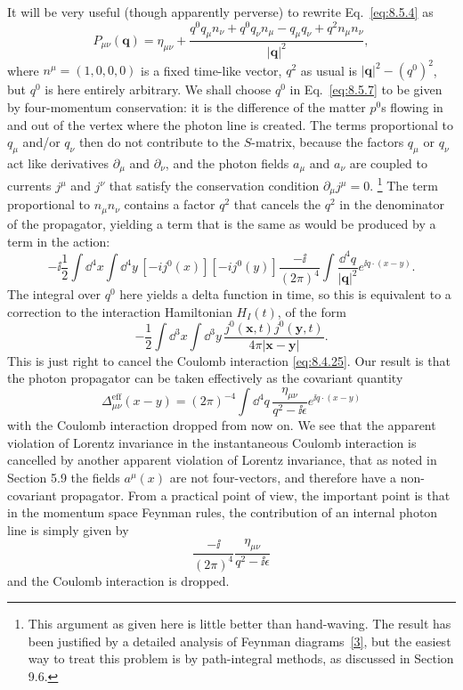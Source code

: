 It will be very useful (though apparently perverse) to rewrite Eq.~\eqref{eq:8.5.4} as
\begin{equation}
P_{\mu\nu}(\mathbf q)=\eta_{\mu\nu}
+\frac{q^0q_\mu n_\nu+q^0q_\nu n_\mu-q_\mu q_\nu+q^2n_\mu n_\nu}
       {\lvert\mathbf q\rvert^2},
\tag{8.5.7}\label{eq:8.5.7}
\end{equation}
where $n^\mu=(1,0,0,0)$ is a fixed time-like vector, $q^2$ as usual is
$\lvert\mathbf q\rvert^2-(q^0)^2$, but $q^0$ is here entirely
arbitrary. We shall choose $q^0$ in Eq.~\eqref{eq:8.5.7} to be given by
four-momentum conservation: it is the difference of the matter $p^0$s flowing
in and out of the vertex where the photon line is created. The terms
proportional to $q_\mu$ and/or $q_\nu$ then do not contribute to the $S$-matrix,
because the factors $q_\mu$ or $q_\nu$ act like derivatives $\partial_\mu$ and
$\partial_\nu$, and the photon fields $a_\mu$ and $a_\nu$ are coupled to
currents $j^\mu$ and $j^\nu$ that satisfy the conservation condition
$\partial_\mu j^\mu=0$.
\footnote{This argument as given here is little better than hand-waving. The
result has been justified by a detailed analysis of Feynman diagrams~\hyperref[ref:8.3]{[3]}, but
the easiest way to treat this problem is by path-integral methods, as discussed
in Section 9.6.}
The term proportional to $n_\mu n_\nu$ contains a factor $q^2$ that cancels the
$q^2$ in the denominator of the propagator, yielding a term that is the same
as would be produced by a term in the action:
\[
-\ii\frac12\int \dd^4x\int \dd^4y\,
[-ij^0(x)][-ij^0(y)]\frac{-\ii}{(2\pi)^4}
\int\frac{\dd^4q}{\lvert\mathbf q\rvert^2}e^{\ii q\cdot(x-y)}.
\]
The integral over $q^0$ here yields a delta function in time, so this is
equivalent to a correction to the interaction Hamiltonian $H_I(t)$, of the
form
\[
-\frac12\int \dd^3x\int \dd^3y\,
\frac{j^0(\mathbf x,t)j^0(\mathbf y,t)}
     {4\pi\lvert\mathbf x-\mathbf y\rvert}.
\]
This is just right to cancel the Coulomb interaction \eqref{eq:8.4.25}. Our result is
that the photon propagator can be taken effectively as the covariant quantity
\begin{equation}
\Delta^{\mathrm{eff}}_{\mu\nu}(x-y)
=(2\pi)^{-4}\int \dd^4q\,
\frac{\eta_{\mu\nu}}{q^2-\ii\epsilon}e^{\ii q\cdot(x-y)}
\tag{8.5.8}\label{eq:8.5.8}
\end{equation}
with the Coulomb interaction dropped from now on. We see that the apparent
violation of Lorentz invariance in the instantaneous Coulomb interaction is
cancelled by another apparent violation of Lorentz invariance, that as noted
in Section 5.9 the fields $a^\mu(x)$ are not four-vectors, and therefore have
a non-covariant propagator. From a practical point of view, the important
point is that in the momentum space Feynman rules, the contribution of an
internal photon line is simply given by
\begin{equation}
\frac{-\ii}{(2\pi)^4}\frac{\eta_{\mu\nu}}{q^2-\ii\epsilon}
\tag{8.5.9}\label{eq:8.5.9}
\end{equation}
and the Coulomb interaction is dropped.
